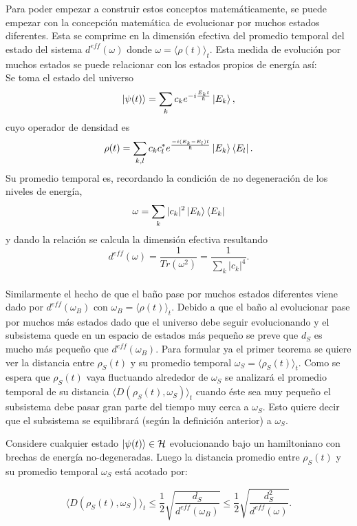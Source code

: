 Para poder empezar a construir estos conceptos matemáticamente, se puede empezar con la concepción matemática de evolucionar por muchos estados diferentes. Esta se comprime en la dimensión efectiva del promedio temporal del estado del sistema $d^{eff}(\omega)$ donde $\omega= \big \langle \rho(t) \big\rangle_{t}$. Esta medida de evolución por muchos estados se puede relacionar con los estados propios de energía así:
\\
Se toma el estado del universo
\begin{equation}
\ket{\psi(t)} = \sum_{k} c_{k} e^{-i\frac{E_{k}t}{\hbar}} \ket{E_{k}},
\end{equation}
cuyo operador de densidad es 
\begin{equation}
\rho(t)=\sum_{k,l} c_{k} c_{l}^{*} e^{\frac{-i(E_{k}-E_{l})t}{\hbar}}\ket{E_{k}} \bra{E_{l}}.
\end{equation}
Su promedio temporal es, recordando la condición de no degeneración de los niveles de energía,
\begin{equation}
\omega= \sum_{k} |c_{k}|^{2} \ket{E_{k}} \bra{E_{k}}
\end{equation}
y dando la relación se calcula la dimensión efectiva resultando 
\begin{equation}
d^{eff}(\omega)=\frac{1}{Tr(\omega^{2})}=\frac{1}{\sum_{k} |c_{k}|^{4} }.
\end{equation}
\\
Similarmente el hecho de que el baño pase por muchos estados diferentes viene dado por $d^{eff}(\omega_{B})$ con $\omega_{B}=\langle \rho(t) \rangle_{t}$. Debido a que el baño al evolucionar pase por muchos más estados dado que el universo debe seguir evolucionando y el subsistema quede en un espacio de estados más pequeño se preve que $d_{S}$ es mucho más pequeño que $d^{eff}(\omega_{B})$. Para formular ya el primer teorema se quiere ver la distancia entre $\rho_{S}(t)$ y su promedio temporal $\omega_{S}= \langle \rho_{S}(t) \rangle_{t}$. Como se espera que $\rho_{S}(t) $ vaya fluctuando alrededor de $\omega_{S}$ se analizará el promedio temporal de su distancia $\langle D(\rho_{S}(t) ,\omega_{S}) \rangle_{t}$ cuando éste sea muy pequeño el subsistema debe pasar gran parte del tiempo muy cerca a $\omega_{S}$. Esto quiere decir que el subsistema se equilibrará (según la definición anterior) a $\omega_{S}$.

\begin{theorem} \label{equlibracion}

Considere cualquier estado $\ket{\psi(t)} \in \mathcal{H}$ evolucionando bajo un hamiltoniano con brechas de energía no-degeneradas. Luego la distancia promedio entre $\rho_{S}(t)$ y su promedio temporal $\omega_{S}$ está acotado por:

\begin{equation}
\langle D(\rho_{S}(t) ,\omega_{S}) \rangle_{t} \le \frac{1}{2} \sqrt{\frac{d_{S}}{d^{eff}(\omega_{B})}} \le \frac{1}{2} \sqrt{\frac{d_{S}^{2}}{d^{eff}(\omega)}}.
\end{equation}
\end{theorem}

